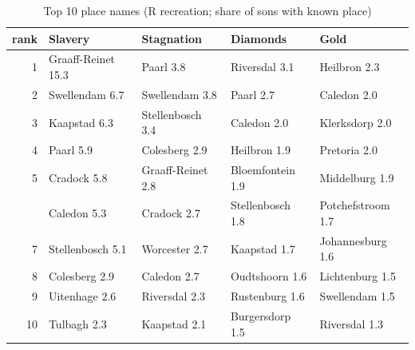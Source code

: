 \begin{table}

\caption{Top 10 place names (R recreation; share of sons with known place)}
\centering
\begin{tabular}[t]{rllll}
\toprule
rank & Slavery & Stagnation & Diamonds & Gold\\
\midrule
1 & Graaff-Reinet 15.3 & Paarl 3.8 & Riversdal 3.1 & Heilbron 2.3\\
2 & Swellendam 6.7 & Swellendam 3.8 & Paarl 2.7 & Caledon 2.0\\
3 & Kaapstad 6.3 & Stellenbosch 3.4 & Caledon 2.0 & Klerksdorp 2.0\\
4 & Paarl 5.9 & Colesberg 2.9 & Heilbron 1.9 & Pretoria 2.0\\
5 & Cradock 5.8 & Graaff-Reinet 2.8 & Bloemfontein 1.9 & Middelburg 1.9\\
\addlinespace
6 & Caledon 5.3 & Cradock 2.7 & Stellenbosch 1.8 & Potchefstroom 1.7\\
7 & Stellenbosch 5.1 & Worcester 2.7 & Kaapstad 1.7 & Johannesburg 1.6\\
8 & Colesberg 2.9 & Caledon 2.7 & Oudtshoorn 1.6 & Lichtenburg 1.5\\
9 & Uitenhage 2.6 & Riversdal 2.3 & Rustenburg 1.6 & Swellendam 1.5\\
10 & Tulbagh 2.3 & Kaapstad 2.1 & Burgersdorp 1.5 & Riversdal 1.3\\
\bottomrule
\end{tabular}
\end{table}
